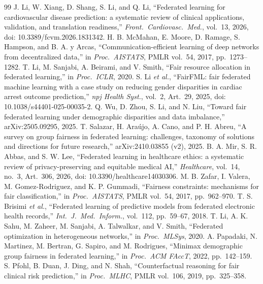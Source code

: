 \begin{thebibliography}{99}\small
{} J. Li, W. Xiang, D. Shang, S. Li, and Q. Li, ``Federated learning for cardiovascular disease prediction: a systematic review of clinical applications, validation, and translation readiness,'' \emph{Front.\ Cardiovasc.\ Med.}, vol.~13, 2026, doi: 10.3389/fcvm.2026.1831342.
 H. B. McMahan, E. Moore, D. Ramage, S. Hampson, and B. A. y Arcas, ``Communication-efficient learning of deep networks from decentralized data,'' in \emph{Proc.\ AISTATS}, PMLR vol.~54, 2017, pp.~1273--1282.
 T. Li, M. Sanjabi, A. Beirami, and V. Smith, ``Fair resource allocation in federated learning,'' in \emph{Proc.\ ICLR}, 2020.
 S. Li \emph{et al.}, ``FairFML: fair federated machine learning with a case study on reducing gender disparities in cardiac arrest outcome prediction,'' \emph{npj Health Syst.}, vol.~2, Art.\ 29, 2025, doi: 10.1038/s44401-025-00035-2.
 Q. Wu, D. Zhou, S. Li, and N. Liu, ``Toward fair federated learning under demographic disparities and data imbalance,'' arXiv:2505.09295, 2025.
 T. Salazar, H. Ara\'ujo, A. Cano, and P. H. Abreu, ``A survey on group fairness in federated learning: challenges, taxonomy of solutions and directions for future research,'' arXiv:2410.03855 (v2), 2025.
 B. A. Mir, S. R. Abbas, and S. W. Lee, ``Federated learning in healthcare ethics: a systematic review of privacy-preserving and equitable medical AI,'' \emph{Healthcare}, vol.~14, no.~3, Art.\ 306, 2026, doi: 10.3390/healthcare14030306.
 M. B. Zafar, I. Valera, M. Gomez-Rodriguez, and K. P. Gummadi, ``Fairness constraints: mechanisms for fair classification,'' in \emph{Proc.\ AISTATS}, PMLR vol.~54, 2017, pp.~962--970.
 T. S. Brisimi \emph{et al.}, ``Federated learning of predictive models from federated electronic health records,'' \emph{Int.\ J.\ Med.\ Inform.}, vol.~112, pp.~59--67, 2018.
 T. Li, A. K. Sahu, M. Zaheer, M. Sanjabi, A. Talwalkar, and V. Smith, ``Federated optimization in heterogeneous networks,'' in \emph{Proc.\ MLSys}, 2020.
 A. Papadaki, N. Martinez, M. Bertran, G. Sapiro, and M. Rodrigues, ``Minimax demographic group fairness in federated learning,'' in \emph{Proc.\ ACM FAccT}, 2022, pp.~142--159.
 S. Pfohl, B. Duan, J. Ding, and N. Shah, ``Counterfactual reasoning for fair clinical risk prediction,'' in \emph{Proc.\ MLHC}, PMLR vol.~106, 2019, pp.~325--358.

\end{thebibliography}
